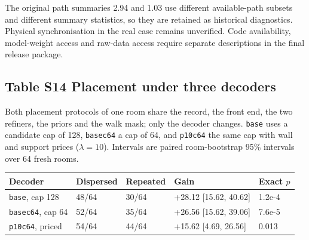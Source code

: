 \documentclass[10pt,letterpaper]{article}
\begin{document}
The original path summaries 2.94 and 1.03 use different available-path
subsets and different summary statistics, so they are retained as
historical diagnostics. Physical synchronisation in the real case
remains unverified. Code availability, model-weight access and raw-data
access require separate descriptions in the final release package.


\begin{minipage}{\linewidth}\subsection*{Table S14 Placement under three decoders}
Both placement protocols of one room share the record, the front end, the two
refiners, the priors and the walk mask; only the decoder changes. {\tt base}
uses a candidate cap of 128, {\tt basec64} a cap of 64, and {\tt p10c64} the
same cap with wall and support prices ($\lambda=10$). Intervals are paired
room-bootstrap 95\% intervals over 64 fresh rooms.

\begin{center}\small\begin{tabular}{@{}p{}p{}p{}p{}p{}@{}}\toprule
\textbf{Decoder} & \textbf{Dispersed} & \textbf{Repeated} & \textbf{Gain} & \textbf{Exact $p$} \\ \midrule
{\tt base}, cap 128 & 48/64 & 30/64 & +28.12 {[}15.62, 40.62{]} & 1.2e-4 \\
{\tt basec64}, cap 64 & 52/64 & 35/64 & +26.56 {[}15.62, 39.06{]} & 7.6e-5 \\
{\tt p10c64}, priced & 54/64 & 44/64 & +15.62 {[}4.69, 26.56{]} & 0.013 \\
\end{tabular}\end{center}
\end{minipage}
\end{document}
